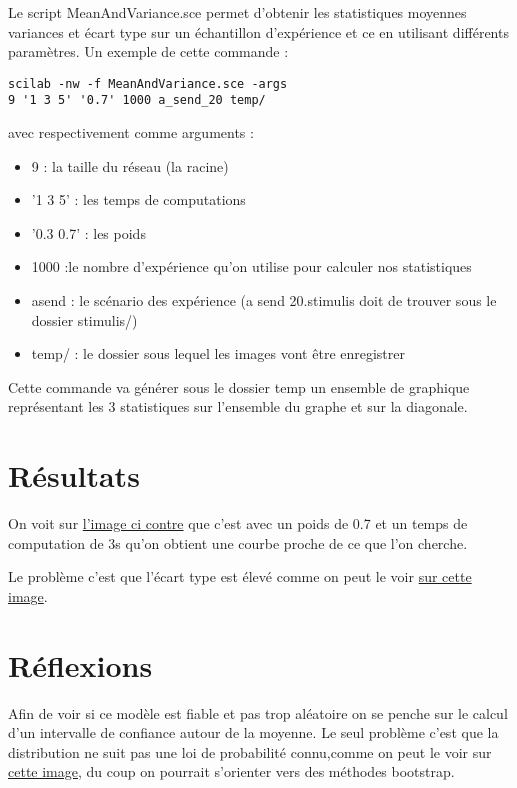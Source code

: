 \documentclass{report}
\begin{document}
Le script MeanAndVariance.sce permet d'obtenir les statistiques moyennes variances et écart type sur un échantillon d'expérience et ce en utilisant différents paramètres. Un exemple de cette commande : 

\begin{verbatim} 
scilab -nw -f MeanAndVariance.sce -args 
9 '1 3 5' '0.7' 1000 a_send_20 temp/
\end{verbatim}

avec respectivement comme arguments :

\begin{itemize}
  \item 9 : la taille du réseau (la racine)
  \item '1 3 5' : les temps de computations 
  \item '0.3 0.7' : les poids
  \item 1000 :le nombre d'expérience qu'on utilise pour calculer nos statistiques
  \item a\textunderscore send : le scénario des expérience (a \textunderscore send \textunderscore 20.stimulis doit de trouver sous le dossier stimulis/)
  \item temp/ : le dossier sous lequel les images vont être enregistrer
\end{itemize}

Cette commande va générer sous le dossier temp un ensemble de graphique représentant les 3 statistiques sur l'ensemble du graphe et sur la diagonale.

\section{Résultats}

On voit sur \href{run:images/global_spike_data_diag1_moyenne_inita_send_taille9.png}{l'image ci contre} que c'est avec un poids de 0.7 et un temps de computation de 3s qu'on obtient une courbe proche de ce que l'on cherche.

Le problème c'est que l'écart type est élevé comme on peut le voir \href{run:images/global_spike_data_diag1_ecart type_inita_send_taille9.png}{sur cette image}. 

\section{Réflexions}

Afin de voir si ce modèle est fiable et pas trop aléatoire on se penche sur le calcul d'un intervalle de confiance autour de la moyenne. Le seul problème c'est que la distribution ne suit pas une loi de probabilité connu,comme on peut le voir sur \href{run:images/violin.png}{cette image}, du coup on pourrait s'orienter vers des méthodes bootstrap.
\end{document}
